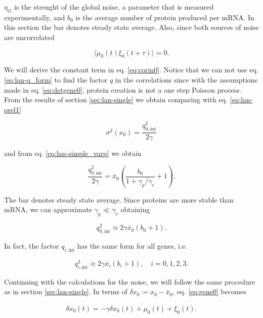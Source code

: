 $\eta_G$ is the strenght of the global noise, a parameter that is measured experimentally, and $b_0$ is the average number of protein produced per mRNA. In this section the bar denotes steady state average. Also, since both sources of noise are uncorrelated

\begin{equation}
\label{eq:corinex0}
\langle\mu_0(t)\xi_0(t+\tau)\rangle = 0.
\end{equation}

We will derive the constant term in eq. \eqref{eq:corin0}. Notice that we can not use eq. \eqref{eq:lan-q_form} to find the factor $q$ in the correlations since with the assumptions made in eq. \eqref{eq:detgene0}, protein creation is not a one step Poisson process. From the results of section \ref{sec:lan-single} we obtain comparing with eq. \eqref{eq:lan-qrel1}

\begin{equation*}
  \sigma^2(x_0) = \frac{q_{0,\text{int}}^2}{2\gamma}
\end{equation*}

and from eq. \eqref{eq:lan-simple_varp} we obtain

\begin{equation*}
  \frac{q_{0,\text{int}}^2}{2\gamma}=\bar{x}_0\left(\frac{b_0}{1+\gamma_p/\gamma_r}+1\right).
\end{equation*}

The bar denotes steady state average. Since proteins are more stable than mRNA, we can approximate $\gamma_p\ll\gamma_r$ obtaining

\begin{equation*}
  q_{0,\text{int}}^2 \approx 2\gamma\bar{x}_0(b_0+1).
\end{equation*}

In fact, the factor $q_{i,\text{int}}$ has the same form for all genes, i.e.

\begin{equation*}
  q_{i,\text{int}}^2 \approx 2\gamma\bar{x}_i(b_i+1),\quad i = 0,1,2,3.
\end{equation*}

Continuing with the calculations for the noise, we will follow the same procedure as in section \ref{sec:lan-single}. In terms of $\delta x_0 \coloneqq x_0 - \bar{x}_0$, eq. \eqref{eq:gene0} becomes

\begin{equation*}
\dot{\delta x_0}(t) = -\gamma \delta x_0(t) + \mu_0(t) + \xi_0(t).
\end{equation*}

